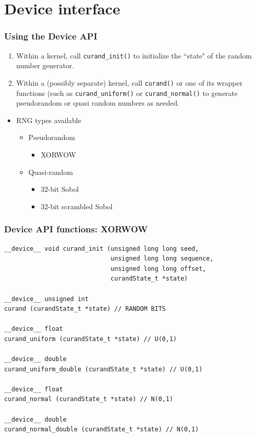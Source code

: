\documentclass[handout]{beamer}
\numberwithin{equation}{section}
\begin{document}
\section{Device interface}


\begin{frame}
\frametitle{Using the Device API}
\begin{enumerate}
\item Within a kernel, call {\tt curand\_init()} to initialize the ``state" of the random number generator.
\pause \item Within a (possibly separate) kernel, call {\tt curand()} or one of its wrapper functions (such as {\tt curand\_uniform()} or {\tt curand\_normal()} to generate pseudorandom or quasi random numbers as needed.
\end{enumerate}

\begin{itemize}
\pause \item RNG types available
\begin{itemize}
\pause \item Pseudorandom
\begin{itemize}
\item XORWOW
\end{itemize}
\pause \item Quasi-random
\begin{itemize}
\item 32-bit Sobol
\item 32-bit scrambled Sobol
\end{itemize}
\end{itemize}
\end{itemize}
\end{frame}


\begin{frame}[fragile]
\frametitle{Device API functions: XORWOW}

\lstset{basicstyle=\tiny}
\begin{lstlisting}
__device__ void curand_init (unsigned long long seed, 
                             unsigned long long sequence,
                             unsigned long long offset, 
                             curandState_t *state)

__device__ unsigned int 
curand (curandState_t *state) // RANDOM BITS

__device__ float
curand_uniform (curandState_t *state) // U(0,1)

__device__ double
curand_uniform_double (curandState_t *state) // U(0,1)

__device__ float
curand_normal (curandState_t *state) // N(0,1)

__device__ double
curand_normal_double (curandState_t *state) // N(0,1)
\end{lstlisting}
\end{frame}
\end{document}
